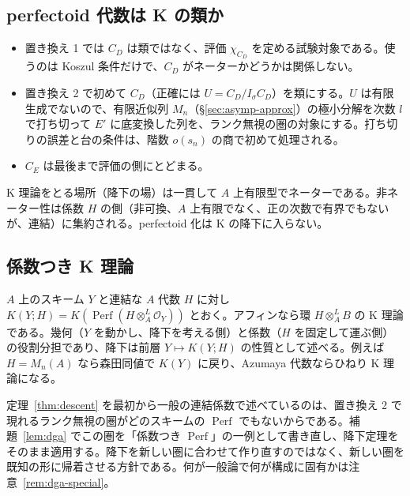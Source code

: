 \documentclass[11pt,a4paper]{ltjsarticle}
\numberwithin{equation}{section}
\theoremstyle{plain}
\theoremstyle{definition}
\theoremstyle{definition}
\newcommand{\Perf}{\operatorname{Perf}}
\begin{document}
\subsection{perfectoid 代数は K の類か}
\begin{itemize}
  \item 置き換え 1 では $C_D$ は類ではなく、評価 $\chi_{C_D}$ を定める試験対象である。使うのは Koszul 条件だけで、$C_D$ がネーターかどうかは関係しない。
  \item 置き換え 2 で初めて $C_D$（正確には $U=C_D/I_\sigma C_D$）を類にする。$U$ は有限生成でないので、有限近似列 $M_n$（§\ref{sec:asymp-approx}）の極小分解を次数 $l$ で打ち切って $E'$ に底変換した列を、ランク無視の圏の対象にする。打ち切りの誤差と台の条件は、階数 $o(s_n)$ の商で初めて処理される。
  \item $C_E$ は最後まで評価の側にとどまる。
\end{itemize}
K 理論をとる場所（降下の場）は一貫して $A$ 上有限型でネーターである。非ネーター性は係数 $H$ の側（非可換、$A$ 上有限でなく、正の次数で有界でもないが、連結）に集約される。perfectoid 化は K の降下に入らない。

\subsection{係数つき K 理論}
$A$ 上のスキーム $Y$ と連結な $A$ 代数 $H$ に対し $K(Y;H)=K(\Perf(H\otimes^L_A\mathcal O_Y))$ とおく。アフィンなら環 $H\otimes^L_AB$ の K 理論である。幾何（$Y$ を動かし、降下を考える側）と係数（$H$ を固定して運ぶ側）の役割分担であり、降下は前層 $Y\mapsto K(Y;H)$ の性質として述べる。例えば $H=M_n(A)$ なら森田同値で $K(Y)$ に戻り、Azumaya 代数ならひねり K 理論になる。

定理~\ref{thm:descent} を最初から一般の連結係数で述べているのは、置き換え 2 で現れるランク無視の圏がどのスキームの $\Perf$ でもないからである。補題~\ref{lem:dga} でこの圏を「係数つき $\Perf$」の一例として書き直し、降下定理をそのまま適用する。降下を新しい圏に合わせて作り直すのではなく、新しい圏を既知の形に帰着させる方針である。何が一般論で何が構成に固有かは注意~\ref{rem:dga-special}。
\end{document}
